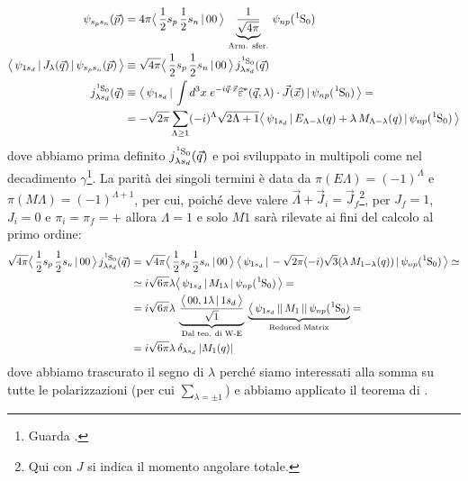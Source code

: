 \begin{displaymath}
\begin{aligned}
\psi_{s_p s_n}(\vec{p}) &= 4\pi \clebs{\frac{1}{2}s_p\,\frac{1}{2}s_n}{00}\, \underbrace{\frac{1}{\sqrt{4\pi}}}_\text{Arm. sfer.} \, \psi_{np}(\ce{^1S_0}) \\
%
\oss{\psi_{1s_d}}{J_\lambda(\vec{q})}{\psi_{s_p s_n}(\vec{p})} &\equiv \sqrt{4\pi} \clebs{\frac{1}{2}s_p\,\frac{1}{2}s_n}{00}\, j^{\ce{^1S_0}}_{\lambda s_d} (\vec{q}) \\
j^{\ce{^1S_0}}_{\lambda s_d} (\vec{q}) &\equiv \oss{\psi_{1s_d}}{\int d^3x \; e^{-i\vec{q}\cdot\vec{x}}\widehat{\varepsilon}^*(\vec{q},\lambda) \cdot \vec{J}(\vec{x})}{\psi_{np}(\ce{^1S_0})} = \\
&= -\sqrt{2\pi} \sum_{\Lambda\geq 1} (-i)^\Lambda \sqrt{2\Lambda +1} \oss{\psi_{1s_d}}{E_{\Lambda-\lambda}(q)  + \lambda \, M_{\Lambda-\lambda}(q)}{\psi_{np}(\ce{^1S_0})}
\end{aligned}
\end{displaymath}
dove abbiamo prima definito $j^{\ce{^1S_0}}_{\lambda s_d} (\vec{q})$ e poi sviluppato in multipoli come nel decadimento $\gamma$\footnote{Guarda .}.
La parità dei singoli termini è data da $\pi(E\Lambda)=(-1)^\Lambda$ e $\pi(M\Lambda)=(-1)^{\Lambda+1}$, per cui, poiché deve valere $\vec{\Lambda}+\vec{J}_i = \vec{J}_f$\footnote{Qui con $J$ si indica il momento angolare totale.}, per $J_f = 1$, $J_i = 0$ e $\pi_i=\pi_f=+$ allora $\Lambda = 1$ e solo $M1$ sarà rilevate ai fini del calcolo al primo ordine:
\begin{displaymath}
\begin{aligned}
\sqrt{4\pi} \clebs{\frac{1}{2}s_p\,\frac{1}{2}s_n}{00}\, j^{\ce{^1S_0}}_{\lambda s_d} (\vec{q}) &= \sqrt{4\pi} \clebs{\frac{1}{2}s_p\,\frac{1}{2}s_n}{00}\: \oss{\psi_{1s_d}}{-\sqrt{2\pi}(-i) \sqrt{3} (\lambda\,M_{1-\lambda}(q))}{\psi_{np}(\ce{^1S_0})}\simeq\\
&\simeq i\sqrt{6\pi} \lambda \oss{\psi_{1s_d}}{M_{1\lambda}}{\psi_{np}(\ce{^1S_0})} =\\
&= i \sqrt{6\pi} \lambda \:\underbrace{ \frac{\clebs{00,1\lambda}{1s_d}}{\sqrt{1}}}_\text{Dal teo. di W-E} \: \underbrace{\bigl \langle \, \psi_{1s_d}\,||\,M_1\,||\,\psi_{np}(\ce{^1S_0})}_\text{Reduced Matrix} = \\
&= i \sqrt{6\pi} \lambda \: \delta_{\lambda s_d} \: |M_1(q)|
\end{aligned}
\end{displaymath}
dove abbiamo trascurato il segno di $\lambda$ perché siamo interessati alla somma su tutte le polarizzazioni (per cui $\sum_{\lambda=\pm 1}$) e abbiamo applicato il teorema di \WE{}.

